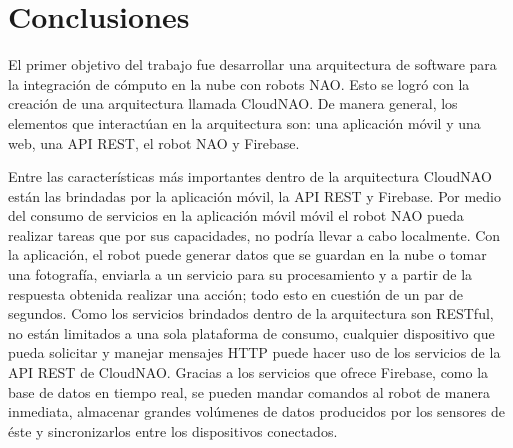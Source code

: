 \chapter*{Conclusiones}
\label{\detokenize{conclusion:cloudnao-una-arquitectura-de-software-para-la-integracion-de-computo-en-la-nube-con-robots-nao}}\label{\detokenize{conclusion:conclusion}}\label{\detokenize{conclusion::doc}}

El primer objetivo del trabajo fue
desarrollar una arquitectura de software para la
integración de cómputo en la nube con robots NAO.
Esto se logró con la creación de una arquitectura llamada
CloudNAO. 
De manera general, los elementos que interactúan en la arquitectura son:
una aplicación móvil y una web, una API REST, el robot NAO y Firebase.

Entre las características más importantes dentro 
de la arquitectura CloudNAO están las brindadas por 
la aplicación móvil, la API REST y Firebase. Por medio
del consumo de servicios en la aplicación móvil móvil 
el robot NAO pueda realizar tareas
que por sus capacidades, no podría llevar a cabo
localmente.
Con la aplicación, el robot puede generar datos que
se guardan en la nube o tomar una fotografía,
enviarla a un servicio para su procesamiento y a partir
de la respuesta obtenida realizar una acción; todo
esto en cuestión de un par de segundos.
Como los servicios brindados dentro de la arquitectura son 
RESTful, no están limitados a una sola plataforma
de consumo, cualquier dispositivo que pueda solicitar y
manejar mensajes HTTP puede hacer uso de los servicios
de la API REST de CloudNAO.
Gracias a los servicios que ofrece Firebase, como la
base de datos en tiempo real, se pueden mandar comandos al 
robot de manera inmediata, almacenar grandes volúmenes de datos
producidos por los sensores de éste y sincronizarlos entre los 
dispositivos conectados.

